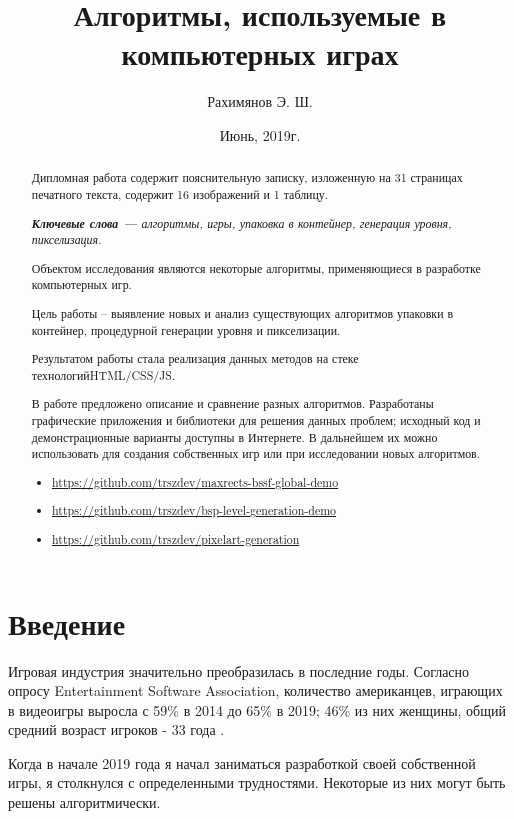 \documentclass[a4paper,12pt]{report}
\title{Алгоритмы, используемые в компьютерных играх}
\author{Рахимянов Э. Ш.}
\date{Июнь, 2019г.}
\theoremstyle{remark}
\begin{document}
\maketitle

\begin{abstract}
Дипломная работа содержит пояснительную записку,
изложенную на 31 страницах печатного текста, содержит 16 изображений и 1 таблицу.

\textit{\textbf{Ключевые слова --- }алгоритмы, игры, упаковка в контейнер, генерация уровня, пикселизация.}

Объектом исследования являются некоторые алгоритмы, применяющиеся в разработке компьютерных игр.

Цель работы – выявление новых и анализ существующих алгоритмов упаковки в контейнер, процедурной генерации уровня и пикселизации.

Результатом работы стала реализация данных методов на стеке технологий\newline HTML/CSS/JS.

В работе предложено описание и сравнение разных алгоритмов. Разработаны графические приложения и библиотеки для решения данных проблем; исходный код и демонстрационные варианты доступны в Интернете. В дальнейшем их можно использовать для создания собственных игр или при исследовании новых алгоритмов.
\begin{itemize}
  \item  \url{https://github.com/trszdev/maxrects-bssf-global-demo}
  \item  \url{https://github.com/trszdev/bsp-level-generation-demo}
  \item  \url{https://github.com/trszdev/pixelart-generation}
\end{itemize}
\end{abstract}

\tableofcontents

\chapter{Введение}

\parindent=1cm
Игровая индустрия значительно преобразилась в последние годы. Согласно опросу Entertainment Software Association, количество американцев, играющих в видеоигры выросла с 59\% в 2014 до 65\% в 2019; 46\% из них женщины, общий средний возраст игроков - 33 года \citep{esa_old}\citep{esa}.

Когда в начале 2019 года я начал заниматься разработкой своей собственной игры, я столкнулся с определенными трудностями. Некоторые из них могут быть решены алгоритмически.
\end{document}
